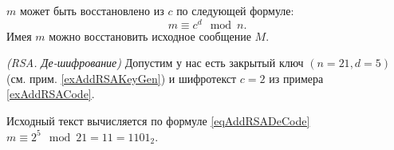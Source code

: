 $m$ может быть восстановлено из $c$ по следующей формуле:
\begin{equation}
m \equiv c^d \mod{n}.
\label{eqAddRSADeCode}
\end{equation}
Имея $m$ можно восстановить исходное сообщение $M$.
\begin{example}
\emph{(RSA. Де-шифрование)}
Допустим у нас есть закрытый ключ $\left(n=21, d=5\right)$ (см. прим. \ref{exAddRSAKeyGen}) и шифротекст $c = 2$ из примера \ref{exAddRSACode}.

Исходный текст вычисляется по формуле \eqref{eqAddRSADeCode} $m \equiv 2^5 \mod{21} = 11 = 1101_2$.
\label{exAddRSADeCode}
\end{example}
